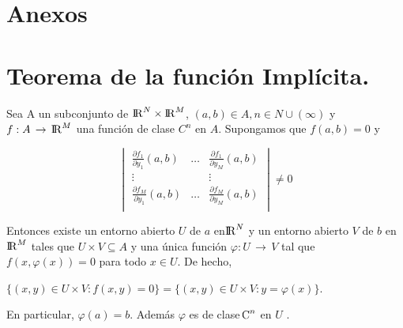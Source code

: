 \documentclass[12pt]{article}
\begin{document}
\clearpage
\null\newpage

\section*{Anexos}
\appendix
\section{Teorema de la función Implícita.}
Sea A un subconjunto de  ${\rm I\!R} ^N \times {\rm I\!R} ^M$, $(a,b) \in A, n \in N \cup(\infty)$ y $f: A\,\to\,{\rm I\!R} ^M$ una función de clase $C^n$ en $A$. Supongamos que $f(a,b)=0$ y 

\[
\begin{vmatrix}
\frac{\partial f_{1}}{ \partial y_{1}}(a,b) & \dots & \frac{\partial f_{1}}{ \partial y_{M}}(a,b) \\
\vdots &&\vdots \\
\frac{\partial f_{M}}{ \partial y_{1}}(a,b) &\dots& \frac{\partial f_{M}}{ \partial y_{M}}(a,b) \\
\end{vmatrix}
\neq 0
\]


Entonces existe un entorno abierto $U$ de $a$ en$ {\rm I\!R} ^N$ y un entorno abierto $V$ de $b$ en  ${\rm I\!R} ^M$ tales que $U \times V \subseteq A$ y una única función $\varphi: U \,\to\, V$ tal que $f(x,\varphi(x))=0$ para todo $x \in U$. De hecho,\\
\begin{center}
$\{ (x,y)  \in U \times V: f(x,y)=0 \} =\{ (x,y)  \in U \times V: y= \varphi (x) \}$.
\end{center}
En particular, $ \varphi (a)=b$. Además  $\varphi$ es de clase ${\rm \!C} ^n$ en $U$ \cite{implicitas}.
\clearpage
\null\newpage
\end{document}
